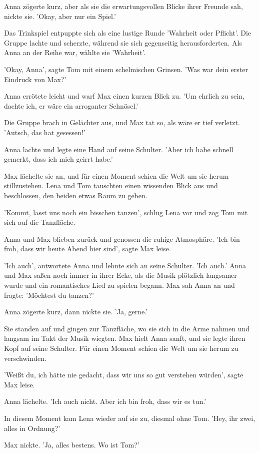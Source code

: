 \documentclass[12pt]{article}
\begin{document}
Anna zögerte kurz, aber als sie die erwartungsvollen Blicke ihrer Freunde sah, nickte sie. 'Okay, aber nur ein Spiel.'

Das Trinkspiel entpuppte sich als eine lustige Runde 'Wahrheit oder Pflicht'. Die Gruppe lachte und scherzte, während sie sich gegenseitig herausforderten. Als Anna an der Reihe war, wählte sie 'Wahrheit'.

'Okay, Anna', sagte Tom mit einem schelmischen Grinsen. 'Was war dein erster Eindruck von Max?'

Anna errötete leicht und warf Max einen kurzen Blick zu. 'Um ehrlich zu sein, dachte ich, er wäre ein arroganter Schnösel.'

Die Gruppe brach in Gelächter aus, und Max tat so, als wäre er tief verletzt. 'Autsch, das hat gesessen!'

Anna lachte und legte eine Hand auf seine Schulter. 'Aber ich habe schnell gemerkt, dass ich mich geirrt habe.'

Max lächelte sie an, und für einen Moment schien die Welt um sie herum stillzustehen. Lena und Tom tauschten einen wissenden Blick aus und beschlossen, den beiden etwas Raum zu geben.

'Kommt, lasst uns noch ein bisschen tanzen', schlug Lena vor und zog Tom mit sich auf die Tanzfläche.

Anna und Max blieben zurück und genossen die ruhige Atmosphäre. 'Ich bin froh, dass wir heute Abend hier sind', sagte Max leise.

'Ich auch', antwortete Anna und lehnte sich an seine Schulter. 'Ich auch.' Anna und Max saßen noch immer in ihrer Ecke, als die Musik plötzlich langsamer wurde und ein romantisches Lied zu spielen begann. Max sah Anna an und fragte: 'Möchtest du tanzen?'

Anna zögerte kurz, dann nickte sie. 'Ja, gerne.'

Sie standen auf und gingen zur Tanzfläche, wo sie sich in die Arme nahmen und langsam im Takt der Musik wiegten. Max hielt Anna sanft, und sie legte ihren Kopf auf seine Schulter. Für einen Moment schien die Welt um sie herum zu verschwinden.

'Weißt du, ich hätte nie gedacht, dass wir uns so gut verstehen würden', sagte Max leise.

Anna lächelte. 'Ich auch nicht. Aber ich bin froh, dass wir es tun.'

In diesem Moment kam Lena wieder auf sie zu, diesmal ohne Tom. 'Hey, ihr zwei, alles in Ordnung?'

Max nickte. 'Ja, alles bestens. Wo ist Tom?'
\end{document}
